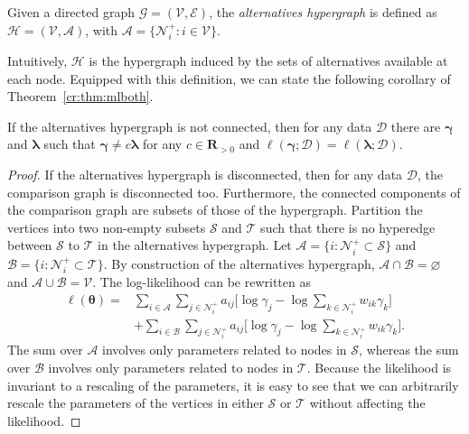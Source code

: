 \begin{definition}
Given a directed graph $\mathcal{G} = (\mathcal{V}, \mathcal{E})$, the \emph{alternatives hypergraph} is defined as $\mathcal{H} = (\mathcal{V}, \mathcal{A})$, with $\mathcal{A} = \{ \mathcal{N}^+_i : i \in \mathcal{V} \}$.
\end{definition}

Intuitively, $\mathcal{H}$ is the hypergraph induced by the sets of alternatives available at each node.
Equipped with this definition, we can state the following corollary of Theorem~\ref{cr:thm:mlboth}.

\begin{corollary}
\label{cr:thm:mlnecessary}
If the alternatives hypergraph is not connected, then for any data $\mathcal{D}$ there are $\bm{\gamma}$ and $\bm{\lambda}$ such that $\bm{\gamma} \neq c \bm{\lambda}$ for any $c \in \mathbf{R}_{>0}$ and $\ell(\bm{\gamma} ; \mathcal{D}) = \ell(\bm{\lambda} ; \mathcal{D}).$
\end{corollary}

\begin{proof}
If the alternatives hypergraph is disconnected, then for any data $\mathcal{D}$, the comparison graph is disconnected too.
Furthermore, the connected components of the comparison graph are subsets of those of the hypergraph.
Partition the vertices into two non-empty subsets $\mathcal{S}$ and $\mathcal{T}$ such that there is no hyperedge between $\mathcal{S}$ to $\mathcal{T}$ in the alternatives hypergraph.
Let $\mathcal{A} = \{ i : \mathcal{N}^+_i \subset \mathcal{S} \}$ and $\mathcal{B} = \{ i : \mathcal{N}^+_i \subset \mathcal{T} \}$.
By construction of the alternatives hypergraph, $\mathcal{A} \cap \mathcal{B} = \varnothing$ and $\mathcal{A} \cup \mathcal{B} = \mathcal{V}$.
The log-likelihood can be rewritten as
\begin{align*}
\ell(\bm{\theta}) =
    &\sum_{i \in \mathcal{A}} \sum_{j \in \mathcal{N}^+_i} a_{ij}
        \bigg[ \log \gamma_j - \log \sum_{k \in \mathcal{N}^+_i} w_{ik} \gamma_k \bigg] \\
    &+ \sum_{i \in \mathcal{B}} \sum_{j \in \mathcal{N}^+_i} a_{ij}
        \bigg[ \log \gamma_j - \log \sum_{k \in \mathcal{N}^+_i} w_{ik} \gamma_k \bigg].
\end{align*}
The sum over $\mathcal{A}$ involves only parameters related to nodes in $\mathcal{S}$, whereas the sum over $\mathcal{B}$ involves only parameters related to nodes in $\mathcal{T}$.
Because the likelihood is invariant to a rescaling of the parameters, it is easy to see that we can arbitrarily rescale the parameters of the vertices in either $\mathcal{S}$ or $\mathcal{T}$ without affecting the likelihood.
\end{proof}

